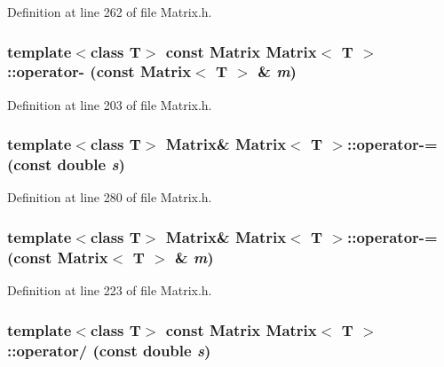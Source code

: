 Definition at line 262 of file Matrix.h.

\hypertarget{classMatrix_a08e75978ea8288083ef36f53b4ac115d}{
\subsubsection[{operator-\/}]{\setlength{\rightskip}{0pt plus 5cm}template$<$class T$>$ const {\bf Matrix} {\bf Matrix}$<$ T $>$::operator-\/ (const {\bf Matrix}$<$ T $>$ \& {\em m})}}
\label{classMatrix_a08e75978ea8288083ef36f53b4ac115d}


Definition at line 203 of file Matrix.h.

\hypertarget{classMatrix_ad513d4073587eab0cee247875b6c860a}{
\subsubsection[{operator-\/=}]{\setlength{\rightskip}{0pt plus 5cm}template$<$class T$>$ {\bf Matrix}\& {\bf Matrix}$<$ T $>$::operator-\/= (const double {\em s})}}
\label{classMatrix_ad513d4073587eab0cee247875b6c860a}


Definition at line 280 of file Matrix.h.

\hypertarget{classMatrix_a0e459fd035b2435ea016dc93c55ccac0}{
\subsubsection[{operator-\/=}]{\setlength{\rightskip}{0pt plus 5cm}template$<$class T$>$ {\bf Matrix}\& {\bf Matrix}$<$ T $>$::operator-\/= (const {\bf Matrix}$<$ T $>$ \& {\em m})}}
\label{classMatrix_a0e459fd035b2435ea016dc93c55ccac0}


Definition at line 223 of file Matrix.h.

\hypertarget{classMatrix_a2525c0e0feb231dd01fb6ae96aa53dac}{
\subsubsection[{operator/}]{\setlength{\rightskip}{0pt plus 5cm}template$<$class T$>$ const {\bf Matrix} {\bf Matrix}$<$ T $>$::operator/ (const double {\em s})}}
\label{classMatrix_a2525c0e0feb231dd01fb6ae96aa53dac}


